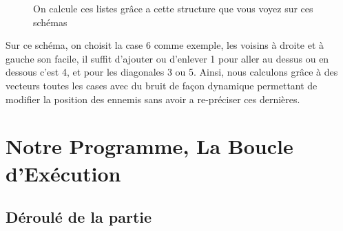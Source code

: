 \documentclass[titlepage]{report}
\begin{document}
{\begin{figure}[H]
    \qquad
    \caption{On calcule ces listes grâce a cette structure que vous voyez sur ces schémas}%
    \label{fig:example}%
\end{figure}
\hspace*{0.5cm}Sur ce schéma, on choisit la case 6 comme exemple, les voisins à droite et à gauche son facile, il suffit d'ajouter ou d'enlever 1 pour aller au dessus ou en dessous c'est 4, et pour les diagonales 3 ou 5. Ainsi, nous calculons grâce à des vecteurs toutes les cases avec du bruit de façon dynamique permettant de modifier la position des ennemis sans avoir a re-préciser ces dernières. 

\section{Notre Programme, La Boucle d'Exécution}
\subsection{Déroulé de la partie}

\begin{figure}[H]
\end{figure}

}
\end{document}
